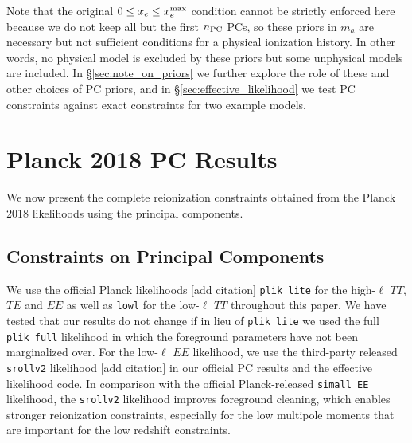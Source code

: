 \documentclass[prd,twocolumn,amsmath,amssymb,floatfix,superscriptaddress,nofootinbib]{revtex4-1}
\begin{document}
%
Note that the original $0\le x_e \le x_e^{\rm max}$ condition cannot be strictly enforced here because we do not keep all but the first $n_{\rm PC}$ PCs, so these priors in $m_a$ are necessary but not sufficient conditions for a physical ionization history.  
In other words, no physical model is excluded by these priors but some unphysical models are included.  In \S \ref{sec:note_on_priors} we further explore the role of these and other choices of PC priors, and in \S\ref{sec:effective_likelihood} we test PC constraints against exact constraints for two example models.  



\section{Planck 2018 PC Results}
\label{sec:results}
We now present the complete reionization constraints obtained from the Planck 2018 likelihoods using the principal components.
\subsection{Constraints on Principal Components}
We use the official Planck likelihoods [add citation] \texttt{plik\_lite} for the high-$\ell$ $TT$, $TE$ and $EE$ as well as \texttt{lowl} for the low-$\ell$ $TT$ throughout this paper. We have tested that our results do not change if in lieu of \texttt{plik\_lite} we used the full \texttt{plik\_full} likelihood in which the foreground parameters have not been marginalized over. For the low-$\ell$ $EE$ likelihood, we use the third-party released \texttt{srollv2} likelihood [add citation] in our official PC results and the effective likelihood code. In comparison with the official Planck-released \texttt{simall\_EE} likelihood, the \texttt{srollv2} likelihood improves foreground cleaning, 
which enables stronger reionization constraints, especially for the low multipole moments that are important for the low redshift constraints.

\end{document}
